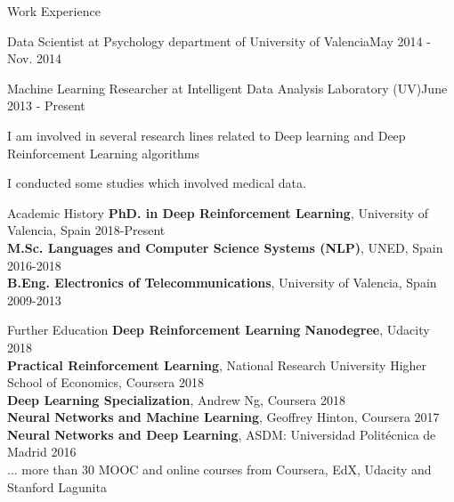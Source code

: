 \documentclass{resume} %
\begin{document}
\begin{rSection}{ Work Experience }
\begin{rSubsection}{Data Scientist at Psychology department of University of Valencia}{May 2014 - Nov. 2014}{}
\end{rSubsection}

\vspace{-6pt}

\begin{rSubsection}{Machine Learning Researcher at Intelligent Data Analysis Laboratory (UV)}{June 2013 - Present}{}

    \vspace{-3pt}
    
    \item I am involved in several research lines related to Deep learning and Deep Reinforcement Learning algorithms
    \item I conducted some studies which involved medical data.

\end{rSubsection}

\end{rSection}



\begin{rSection}{Academic History}
{\textbf{PhD. in Deep Reinforcement Learning}, University of Valencia, Spain} \hfill {2018-Present}
\\
{\textbf{M.Sc. Languages and Computer Science Systems (NLP)}, UNED, Spain} \hfill {2016-2018}
\\
{\textbf{B.Eng. Electronics of Telecommunications}, University of Valencia, Spain} \hfill {2009-2013}
\end{rSection}

\begin{rSection}{Further Education}
{\textbf{Deep Reinforcement Learning Nanodegree}, Udacity} \hfill {2018}\\
{\textbf{Practical Reinforcement Learning}, National Research University Higher School of Economics, Coursera} \hfill {2018}\\
{\textbf{Deep Learning Specialization}, Andrew Ng, Coursera} \hfill {2018}\\
{\textbf{Neural Networks and Machine Learning}, Geoffrey Hinton, Coursera \hfill {2017}}\\
{\textbf{Neural Networks and Deep Learning}, ASDM: Universidad Politécnica de Madrid \hfill {2016}}\\
{... more than 30 MOOC and online courses from Coursera, EdX, Udacity and Stanford Lagunita}
\end{rSection}
\end{document}
